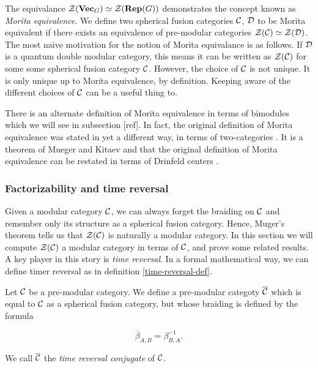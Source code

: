 The equivalance ${\mathcal Z}({\bf Vec}_G)\simeq {\mathcal Z}({\bf Rep}(G))$ demonstrates the concept known as {\em Morita equivalence}. We define two spherical fusion categories ${\mathcal C}$, ${\mathcal D}$ to be Morita equivalent if there exists an equivalence of pre-modular categories ${\mathcal Z}({\mathcal C})\simeq {\mathcal Z}({\mathcal D})$. The most naive motivation for the notion of Morita equivalance is as follows. If ${\mathcal D}$ is a quantum double modular category, this means it can be written as ${\mathcal Z}({\mathcal C})$ for some some spherical fusion category ${\mathcal C}$. However, the choice of ${\mathcal C}$ is not unique. It is only unique up to Morita equivalence, by definition. Keeping aware of the different choices of ${\mathcal C}$ can be a useful thing to.

\begin{rem}
There is an alternate definition of Morita equivalence in terms of bimodules which we will see in subsection [ref]. In fact, the original definition of Morita equivalence was stated in yet a different way, in terms of two-categories \cite{muger2001subfactorsA}. It is a theorem of Mueger and Kitaev and that the original definition of Morita equivalence can be restated in terms of Drinfeld centers \cite{etingof2011weakly}.
\end{rem}

\subsubsection{Factorizability and time reversal}

Given a modular category ${\mathcal C}$, we can always forget the braiding on ${\mathcal C}$ and remember only its structure as a spherical fusion category. Hence, Muger's theorem tells us that ${\mathcal Z}({\mathcal C})$ is naturally a modular category. In this section we will compute ${\mathcal Z}({\mathcal C})$ a modular category in terms of ${\mathcal C}$, and prove some related results. A key player in this story is {\em time reversal}. In a formal mathematical way, we can define timer reversal as in definition \ref{time-reversal-def}.

\begin{defn}\label{time-reversal-def}Let ${\mathcal C}$ be a pre-modular category. We define a pre-modular categoty $\overline{{\mathcal C}}$ which is equal to ${\mathcal C}$ as a spherical fusion category, but whose braiding is defined by the formula

$$\overline{\beta}_{A,B}=\beta_{B,A}^{-1}.$$

We call $\overline{{\mathcal C}}$ the {\em time reversal conjugate} of ${\mathcal C}$.
\end{defn}

